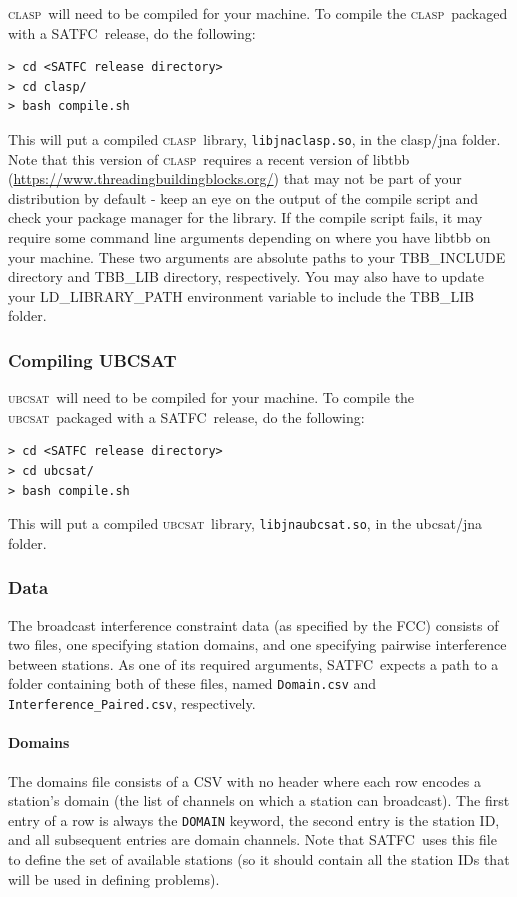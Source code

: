 \documentclass[
10pt, %
letterpaper, %
oneside, %
headinclude,footinclude, %
BCOR5mm, %
needspace, %
]{scrartcl}
\newcommand{\SATFC}{\textsc{SATFC}~}
\newcommand{\clasp}{\textsc{clasp}~}
\newcommand{\ubcsat}{\textsc{ubcsat}~}
\begin{document}
\clasp will need to be compiled for your machine. To compile the \clasp packaged with a \SATFC release, do the following:
\begin{lstlisting}[style=Bash]
> cd <SATFC release directory>
> cd clasp/
> bash compile.sh
\end{lstlisting}
This will put a compiled \clasp library, \texttt{libjnaclasp.so}, in the clasp/jna folder.
Note that this version of \clasp requires a recent version of libtbb (\url{https://www.threadingbuildingblocks.org/}) that may not be part of your distribution by default - keep an eye on the output of the compile script and check your package manager for the library. If the compile script fails, it may require some command line arguments depending on where you have libtbb on your machine. These two arguments are absolute paths to your TBB\_INCLUDE directory and TBB\_LIB directory, respectively. You may also have to update your LD\_LIBRARY\_PATH environment variable to include the TBB\_LIB folder.

\subsubsection{Compiling UBCSAT}

\ubcsat will need to be compiled for your machine. To compile the \ubcsat packaged with a \SATFC release, do the following:
\begin{lstlisting}[style=Bash]
> cd <SATFC release directory>
> cd ubcsat/
> bash compile.sh
\end{lstlisting}
This will put a compiled \ubcsat library, \texttt{libjnaubcsat.so}, in the ubcsat/jna folder.

\subsubsection{Data}\label{sec:data}

The broadcast interference constraint data (as specified by the FCC) consists of two files, one specifying station domains, and one specifying pairwise interference between stations. As one of its required arguments, \SATFC expects a path to a folder containing both of these files, named \texttt{Domain.csv} and \texttt{Interference\_Paired.csv}, respectively.

\paragraph{Domains} The domains file consists of a CSV with no header where each row encodes a station's domain (the list of channels on which a station can broadcast). The first entry of a row is always the \texttt{DOMAIN} keyword, the second entry is the station ID, and all subsequent entries are domain channels. Note that \SATFC uses this file to define the set of available stations (so it should contain all the station IDs that will be used in defining problems).
\end{document}
